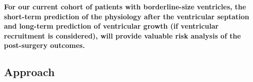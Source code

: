 \textbf{For our current cohort of patients with borderline-size ventricles, the short-term prediction of the physiology after the ventricular septation and long-term prediction of ventricular growth (if ventricular recruitment is considered), will provide valuable risk analysis of the post-surgery outcomes.}




\bigskip










\subsection{Approach}
